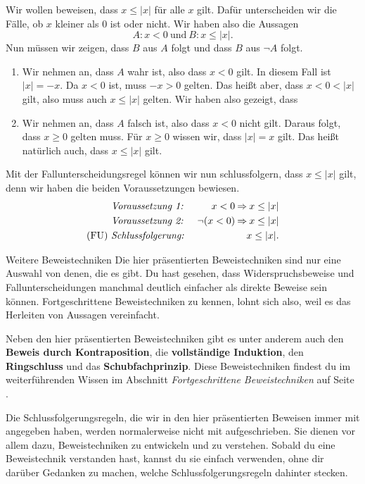 \documentclass[../../main.tex]{subfiles}
\begin{document}
\begin{example}{}
    Wir wollen beweisen, dass $x\leq |x|$ für alle $x$ gilt. Dafür unterscheiden wir die Fälle, ob $x$ kleiner als $0$ ist oder nicht. Wir haben also die Aussagen
    \[A:x<0~\text{und}~B:x\leq |x|.\]
    Nun müssen wir zeigen, dass $B$ aus $A$ folgt und dass $B$ aus $\lnot A$ folgt.
    \begin{enumerate}
         \item
            Wir nehmen an, dass $A$ wahr ist, also dass $x<0$ gilt. In diesem Fall ist $|x|=-x$. Da $x<0$ ist, muss $-x>0$ gelten. Das heißt aber, dass $x<0<|x|$ gilt, also muss auch $x\leq |x|$ gelten. Wir haben also gezeigt, dass 
         \item
            Wir nehmen an, dass $A$ falsch ist, also dass $x<0$ nicht gilt. Daraus folgt, dass $x\geq 0$ gelten muss. Für $x\geq 0$ wissen wir, dass $|x|=x$ gilt. Das heißt natürlich auch, dass $x\leq |x|$ gilt.
    \end{enumerate}
    Mit der Fallunterscheidungsregel können wir nun schlussfolgern, dass $x\leq |x|$ gilt, denn wir haben die beiden Voraussetzungen bewiesen.
    \begin{align*}
        &\text{\emph{Voraussetzung~1:}}~&x<0 \mathbin{\Rightarrow} x\leq |x|\\
        &\text{\emph{Voraussetzung~2:}}~&\lnot (x<0) \mathbin{\Rightarrow} x\leq |x|\\
        \text{(FU)}~&\text{\emph{Schlussfolgerung:}}~&x\leq |x|.
    \end{align*}
\end{example}

\begin{advanced}{Weitere Beweistechniken}
    Die hier präsentierten Beweistechniken sind nur eine Auswahl von denen, die es gibt. Du hast gesehen, dass Widerspruchsbeweise und Fallunterscheidungen manchmal deutlich einfacher als direkte Beweise sein können. Fortgeschrittene Beweistechniken zu kennen, lohnt sich also, weil es das Herleiten von Aussagen vereinfacht.

    Neben den hier präsentierten Beweistechniken gibt es unter anderem auch den \textbf{Beweis durch Kontraposition}, die \textbf{vollständige Induktion}, den \textbf{Ringschluss} und das \textbf{Schubfachprinzip}. Diese Beweistechniken findest du im weiterführenden Wissen im Abschnitt \emph{Fortgeschrittene Beweistechniken} auf Seite \pageref{advanced-proofs}.
\end{advanced}

Die Schlussfolgerungsregeln, die wir in den hier präsentierten Beweisen immer mit angegeben haben, werden normalerweise nicht mit aufgeschrieben. Sie dienen vor allem dazu, Beweistechniken zu entwickeln und zu verstehen. Sobald du eine Beweistechnik verstanden hast, kannst du sie einfach verwenden, ohne dir darüber Gedanken zu machen, welche Schlussfolgerungsregeln dahinter stecken.
\end{document}

